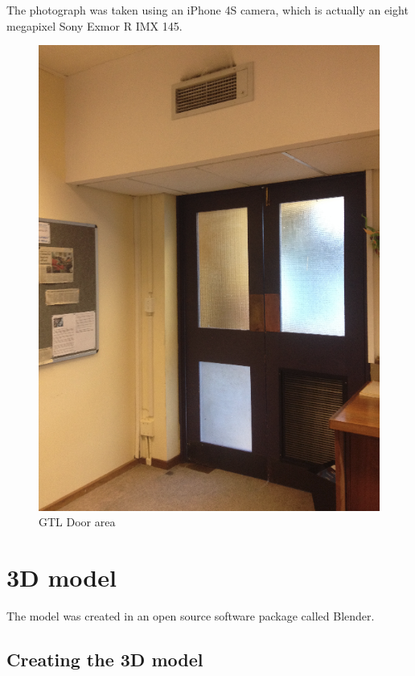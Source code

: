 \documentclass[11pt,a4paper]{report}
\begin{document}
		The photograph was taken using an iPhone 4S camera, which is actually an eight megapixel Sony Exmor R IMX 145.
		
		\begin{figure}[H]
			\centering
			\includegraphics[width=1\textwidth]{gtl_door_area}
			\caption{GTL Door area}
		\end{figure}
		
		
	\section{3D model}
		The model was created in an open source software package called Blender.
		
		\subsection{Creating the 3D model}
\end{document}
